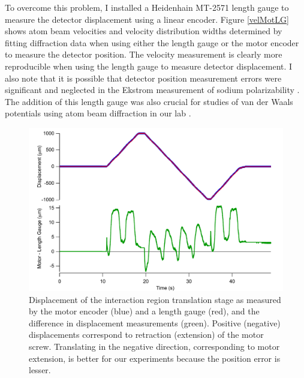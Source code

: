 To overcome this problem, I installed a Heidenhain MT-2571 length gauge to measure the detector displacement using a linear encoder. Figure \ref{velMotLG} shows atom beam velocities and velocity distribution widths determined by fitting diffraction data when using either the length gauge or the motor encoder to measure the detector position. The velocity measurement is clearly more reproducible when using the length gauge to measure detector displacement. I also note that it is possible that detector position measurement errors were significant and neglected in the Ekstrom \etal measurement of sodium polarizability \cite{Eks95}. The addition of this length gauge was also crucial for studies of van der Waals potentials using atom beam diffraction in our lab \cite{Lon09,Lon10}.


\begin{figure}
\includegraphics[width=1\textwidth]{Figures/motLGtrans.pdf}
\caption[Comparison of displacements measured by a motor encoder and a length gauge.]{\label{intRegionMotorLG}Displacement of the interaction region translation stage as measured by the motor encoder (blue) and a length gauge (red), and the difference in displacement measurements (green). Positive (negative) displacements correspond to retraction (extension) of the motor screw. Translating in the negative direction, corresponding to motor extension, is better for our experiments because the position error is lesser.}
\end{figure}



